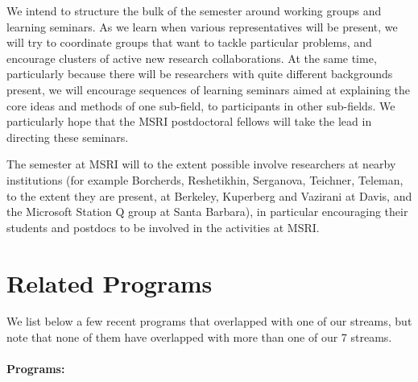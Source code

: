 \documentclass[12pt]{article}
\begin{document}
We intend to structure the bulk of the semester around working groups and learning seminars. As we learn when various representatives will be present, we will try to coordinate groups that want to tackle particular problems, and encourage clusters of active new research collaborations. At the same time, particularly because there will be researchers with quite different backgrounds present, we will encourage sequences of learning seminars aimed at explaining the core ideas and methods of one sub-field, to participants in other sub-fields. We particularly hope that the MSRI postdoctoral fellows will take the lead in directing these seminars.

The semester at MSRI will to the extent possible involve researchers at nearby institutions (for example Borcherds, Reshetikhin, Serganova, Teichner, Teleman, to the extent they are present, at Berkeley, Kuperberg and Vazirani at Davis, and the Microsoft Station Q group at Santa Barbara), in particular encouraging their students and postdocs to be involved in the activities at MSRI.


\section{Related Programs}

We list below a few recent programs that overlapped with one of our streams, but note that none of them have overlapped with more than one of our 7 streams.

\paragraph{Programs:}
\end{document}
